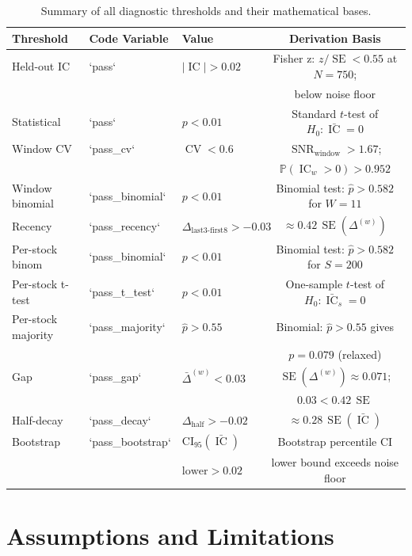 \documentclass[11pt,a4paper]{article}
\theoremstyle{definition}
\newcommand{\IC}{\operatorname{IC}}
\newcommand{\SE}{\operatorname{SE}}
\newcommand{\CV}{\operatorname{CV}}
\newcommand{\Prob}{\mathbb{P}}
\newcommand{\Ho}{H_{0}}
\newcommand{\SNR}{\operatorname{SNR}}
\begin{document}
\begin{table}[htbp]
\centering
\caption{Summary of all diagnostic thresholds and their mathematical bases.}
\label{tab:summary}
\small
\begin{tabular}{lllc}
\toprule
Threshold & Code Variable & Value & Derivation Basis \\
\midrule
Held-out IC & `pass` & $|\IC| > 0.02$ & Fisher z: $z/\SE < 0.55$ at $N=750$; \\
           &        &         & below noise floor \\
Statistical & `pass` & $p < 0.01$ & Standard $t$-test of $\Ho: \bar{\IC}=0$  \\
Window CV  & `pass\_cv` & $\CV < 0.6$ & $\SNR_{\text{window}} > 1.67$; \\
           &        &         & $\Prob(\IC_w > 0) > 0.952$ \\
Window binomial & `pass\_binomial` & $p < 0.01$ & Binomial test: $\hat{p} > 0.582$ for $W=11$ \\
Recency & `pass\_recency` & $\Delta_{\text{last3-first8}} > -0.03$ & $\approx 0.42\,\SE(\Delta^{(w)})$ \\
Per-stock binom & `pass\_binomial` & $p < 0.01$ & Binomial test: $\hat{p} > 0.582$ for $S=200$ \\
Per-stock t-test & `pass\_t\_test` & $p < 0.01$ & One-sample $t$-test of $\Ho: \bar{\IC}_s=0$ \\
Per-stock majority & `pass\_majority` & $\hat{p} > 0.55$ & Binomial: $\hat{p} > 0.55$ gives \\
           &        &         & $p=0.079$ (relaxed) \\
Gap & `pass\_gap` & $\bar{\Delta}^{(w)} < 0.03$ & $\SE(\Delta^{(w)}) \approx 0.071$; \\
    &        &         & $0.03 < 0.42\,\SE$ \\
Half-decay & `pass\_decay` & $\Delta_{\text{half}} > -0.02$ & $\approx 0.28\,\SE(\bar{\IC})$ \\
Bootstrap & `pass\_bootstrap` & $\text{CI}_{95}(\bar{\IC})$ & Bootstrap percentile CI \\
           &        & $\text{lower} > 0.02$ & lower bound exceeds noise floor \\
\bottomrule
\end{tabular}
\end{table}

\section{Assumptions and Limitations}
\end{document}
